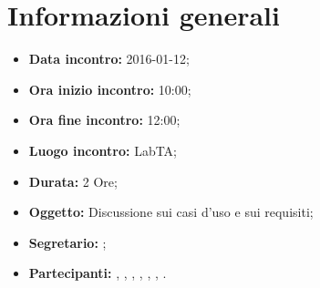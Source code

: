 \newpage
\section{Informazioni generali}
\begin{itemize}
\item \textbf{Data incontro:} 2016-01-12;
\item \textbf{Ora inizio incontro:} 10:00;
\item \textbf{Ora fine incontro:} 12:00;
\item \textbf{Luogo incontro:} LabTA;
\item \textbf{Durata:} 2 Ore;
\item \textbf{Oggetto:} Discussione sui casi d'uso e sui requisiti;
\item \textbf{Segretario:} \SM;
\item \textbf{Partecipanti:} \AF, \FB, \GN, \GR, \MV, \MP, \SM.
\end{itemize}
